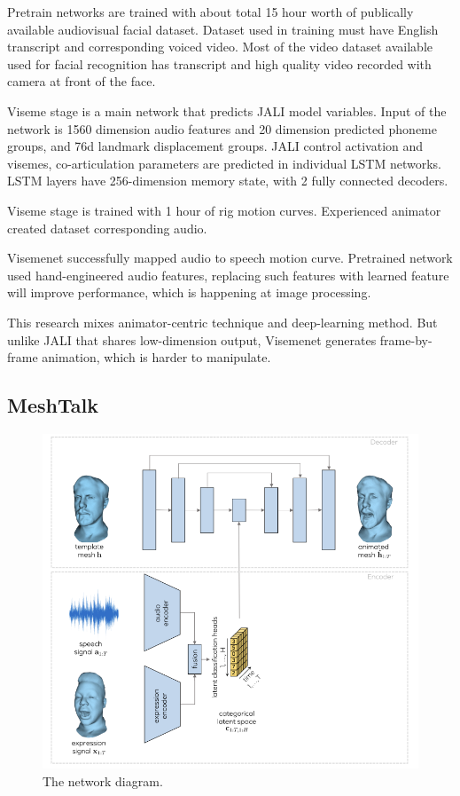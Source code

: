 \documentclass[10pt,twocolumn,letterpaper]{article}
\begin{document}
Pretrain networks are trained with about total 15 hour worth of publically available audiovisual facial dataset. Dataset used in training must have English transcript and corresponding voiced video. Most of the video dataset available used for facial recognition has transcript and high quality video recorded with camera at front of the face.

Viseme stage is a main network that predicts JALI model variables. Input of the network is 1560 dimension audio features and 20 dimension predicted phoneme groups, and 76d landmark displacement groups. JALI control activation and visemes, co-articulation parameters are predicted in individual LSTM networks. LSTM layers have 256-dimension memory state, with 2 fully connected decoders.

Viseme stage is trained with 1 hour of rig motion curves. Experienced animator created dataset corresponding audio.

Visemenet successfully mapped audio to speech motion curve. Pretrained network used hand-engineered audio features, replacing such features with learned feature will improve performance, which is happening at image processing.

This research mixes animator-centric technique and deep-learning method. But unlike JALI that shares low-dimension output, Visemenet generates frame-by-frame animation, which is harder to manipulate.

\subsection{MeshTalk}

\begin{figure}[t]
   \begin{center}
   \includegraphics[width=0.8\linewidth]{meshtalk_overview.png}
   \end{center}
   \caption{The network diagram\cite{richardMeshTalk3DFace2021}.}
   \label{fig:long}
   \label{fig:networkdiag}
 \end{figure}
\end{document}
